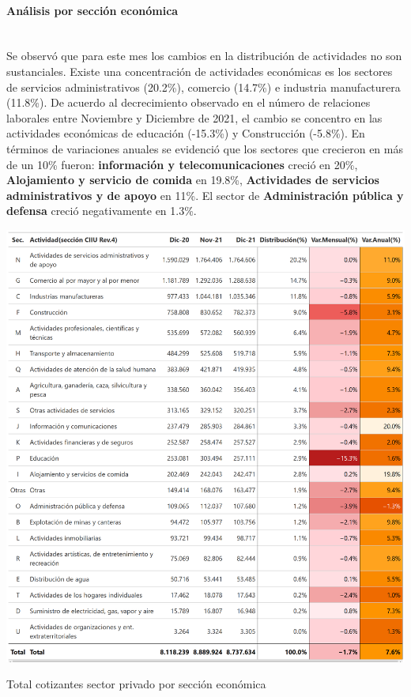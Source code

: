 \FloatBarrier
\paragraph{Análisis por sección económica}\mbox{}\\

Se observó que para este mes los cambios en la distribución de actividades no son sustanciales. Existe una concentración de actividades económicas es los sectores de servicios administrativos (20.2\%), comercio (14.7\%) e industria manufacturera (11.8\%). De acuerdo al decrecimiento observado en el número de relaciones laborales entre Noviembre y Diciembre de 2021, el cambio se concentro en las actividades económicas de educación (-15.3\%) y Construcción (-5.8\%). En términos de variaciones anuales se evidenció que los sectores que crecieron en más de un 10\% fueron: \textbf{información y telecomunicaciones} creció en 20\%, \textbf{Alojamiento y servicio de comida} en 19.8\%, \textbf{Actividades de servicios administrativos y de apoyo} en 11\%. El sector de \textbf{Administración pública y defensa} creció negativamente en 1.3\%. 

\begin{table}[!htbp]
\label{tabla:sector_privado:actividad_economica_mes_interes_21}
\centering
\includegraphics[width = 15cm]{results/02_longitudinal/salida_act_econ_dependientes_21.png}
\caption{Total cotizantes sector privado  por sección económica}%
\end{table}

